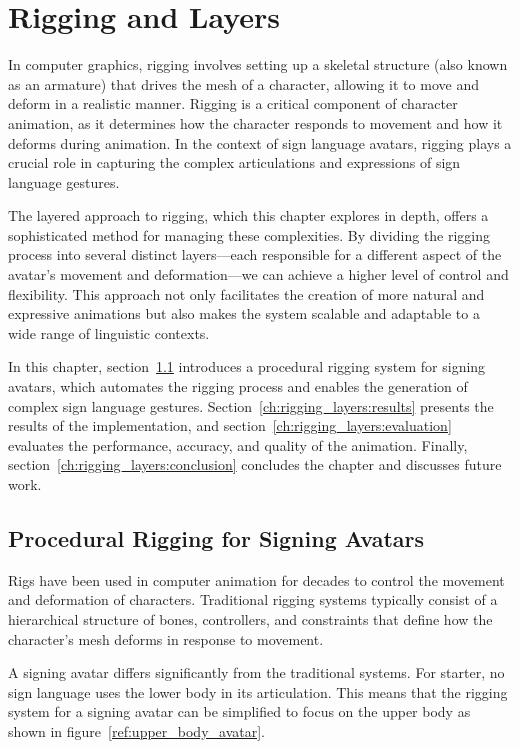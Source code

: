 \documentclass[../../main.tex]{subfiles}
\begin{document}
\chapter{Rigging and Layers}
\label{ch:rigging_layers}

In computer graphics, rigging involves setting up a skeletal structure (also known as an armature) that drives the mesh of a character, allowing it to move and deform in a realistic manner. Rigging is a critical component of character animation, as it determines how the character responds to movement and how it deforms during animation. In the context of sign language avatars, rigging plays a crucial role in capturing the complex articulations and expressions of sign language gestures.

The layered approach to rigging, which this chapter explores in depth, offers a sophisticated method for managing these complexities. By dividing the rigging process into several distinct layers—each responsible for a different aspect of the avatar’s movement and deformation—we can achieve a higher level of control and flexibility. This approach not only facilitates the creation of more natural and expressive animations but also makes the system scalable and adaptable to a wide range of linguistic contexts.

In this chapter, section~\ref{ch:rigging_layers:proc_rig_signing_avatars} introduces a procedural rigging system for signing avatars, which automates the rigging process and enables the generation of complex sign language gestures. Section~\ref{ch:rigging_layers:results} presents the results of the implementation, and section~\ref{ch:rigging_layers:evaluation} evaluates the performance, accuracy, and quality of the animation. Finally, section~\ref{ch:rigging_layers:conclusion} concludes the chapter and discusses future work.

\section{Procedural Rigging for Signing Avatars}
\label{ch:rigging_layers:proc_rig_signing_avatars}

Rigs have been used in computer animation for decades to control the movement and deformation of characters. Traditional rigging systems typically consist of a hierarchical structure of bones, controllers, and constraints that define how the character’s mesh deforms in response to movement.

A signing avatar differs significantly from the traditional systems. For starter, no sign language uses the lower body in its articulation. This means that the rigging system for a signing avatar can be simplified to focus on the upper body as shown in figure~\ref{ref:upper_body_avatar}. 
\end{document}
